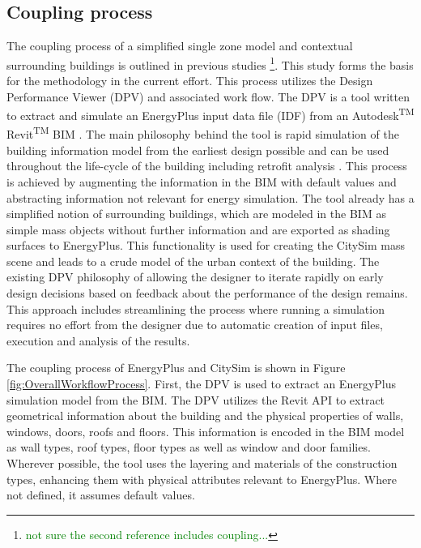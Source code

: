 \documentclass{tBPS2e}
\theoremstyle{plain}
\theoremstyle{definition}
\theoremstyle{remark}
\newcommand{\noteDT}[1]{\footnote{\textcolor{green}{#1}}}
\begin{document}
\subsection{Coupling process}
The coupling process of a simplified single zone model and contextual surrounding buildings is outlined in previous studies \citep{thomas2014multiscale,Thomas:2012wj}\noteDT{not sure the second reference includes coupling...}. This study forms the basis for the methodology in the current effort. This process utilizes the Design Performance Viewer (DPV) and associated work flow. The DPV is a tool written to extract and simulate an EnergyPlus input data file (IDF) from an Autodesk\textsuperscript{TM} Revit\textsuperscript{TM} BIM \citep{Schlueter2009}. The main philosophy behind the tool is rapid simulation of the building information model from the earliest design possible and can be used throughout the life-cycle of the building including retrofit analysis \citep{Miller:2014tu}. This process is achieved by augmenting the information in the BIM with default values and abstracting information not relevant for energy simulation. The tool already has a simplified notion of surrounding buildings, which are modeled in the BIM as simple mass objects without further information and are exported as shading surfaces to EnergyPlus. This functionality is used for creating the CitySim mass scene and leads to a crude model of the urban context of the building. The existing DPV philosophy of allowing the designer to iterate rapidly on early design decisions based on feedback about the performance of the design remains. This approach includes streamlining the process where running a simulation requires no effort from the designer due to automatic creation of input files, execution and analysis of the results.

The coupling process of EnergyPlus and CitySim is shown in Figure \ref{fig:OverallWorkflowProcess}. First, the DPV is used to extract an EnergyPlus simulation model from the BIM. The DPV utilizes the Revit API to extract geometrical information about the building and the physical properties of walls, windows, doors, roofs and floors. This information is encoded in the BIM model as wall types, roof types, floor types as well as window and door families. Wherever possible, the tool uses the layering and materials of the construction types, enhancing them with physical attributes relevant to EnergyPlus. Where not defined, it assumes default values. 
\end{document}
